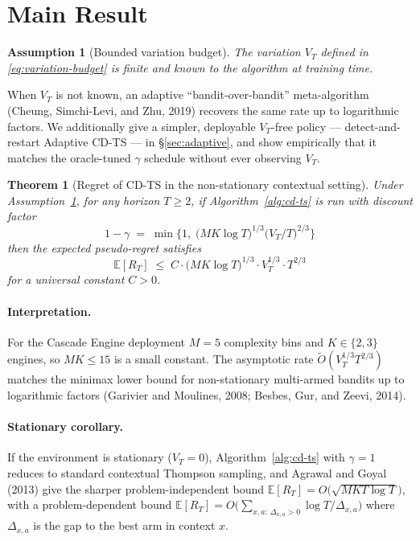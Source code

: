 \documentclass[11pt]{article}
\newtheorem{theorem}{Theorem}
\newtheorem{assumption}{Assumption}
\theoremstyle{definition}
\newcommand{\E}{\mathbb{E}}
\begin{document}
\section{Main Result}
\label{sec:main}

\begin{assumption}[Bounded variation budget]
\label{ass:budget}
The variation $V_T$ defined in \eqref{eq:variation-budget} is finite and known to the algorithm at training time.
\end{assumption}

When $V_T$ is not known, an adaptive ``bandit-over-bandit'' meta-algorithm (Cheung, Simchi-Levi, and Zhu, 2019) recovers the same rate up to logarithmic factors. We additionally give a simpler, deployable $V_T$-free policy --- detect-and-restart Adaptive CD-TS --- in \S\ref{sec:adaptive}, and show empirically that it matches the oracle-tuned $\gamma$ schedule without ever observing $V_T$.

\begin{theorem}[Regret of CD-TS in the non-stationary contextual setting]
\label{thm:main}
Under Assumption~\ref{ass:budget}, for any horizon $T \geq 2$, if Algorithm~\ref{alg:cd-ts} is run with discount factor
\[
    1 - \gamma \;=\; \min\!\Big\{ 1,\; \big(M K \log T \big)^{1/3} \big(V_T / T\big)^{2/3}\Big\}
\]
then the expected pseudo-regret satisfies
\begin{equation}
    \E[R_T] \;\leq\; C \cdot \big(M K \log T\big)^{1/3} \cdot V_T^{1/3} \cdot T^{2/3}
    \label{eq:main-bound}
\end{equation}
for a universal constant $C > 0$.
\end{theorem}

\paragraph{Interpretation.} For the Cascade Engine deployment $M = 5$ complexity bins and $K \in \{2, 3\}$ engines, so $MK \leq 15$ is a small constant. The asymptotic rate $\widetilde{O}(V_T^{1/3} T^{2/3})$ matches the minimax lower bound for non-stationary multi-armed bandits up to logarithmic factors (Garivier and Moulines, 2008; Besbes, Gur, and Zeevi, 2014).

\paragraph{Stationary corollary.} If the environment is stationary ($V_T = 0$), Algorithm~\ref{alg:cd-ts} with $\gamma = 1$ reduces to standard contextual Thompson sampling, and Agrawal and Goyal (2013) give the sharper problem-independent bound $\E[R_T] = O\!\big(\sqrt{M K T \log T}\big)$, with a problem-dependent bound $\E[R_T] = O\!\big(\sum_{x,a:\, \Delta_{x,a} > 0} \log T / \Delta_{x,a}\big)$ where $\Delta_{x,a}$ is the gap to the best arm in context $x$.
\end{document}
